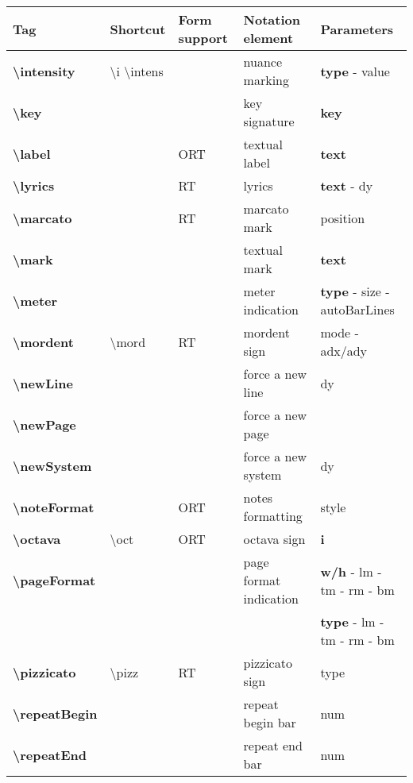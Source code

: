 \documentclass[a4paper, landscape, 10pt]{article}
\begin{document}
\begin{tabularx}{\linewidth}{p{3cm}p{4.5cm}p{3cm}p{5.5cm}l}
    \hline
    \textbf{Tag}&\textbf{Shortcut}&\textbf{Form support}&\textbf{Notation element}&\textbf{Parameters}\\
    \hline
    \textbf{\textbackslash{}intensity}&\textbackslash{}i \textbackslash{}intens&&nuance marking&\textbf{type} - value\\
    \hline
    \textbf{\textbackslash{}key}&&&key signature&\textbf{key}\\
    \hline
    \textbf{\textbackslash{}label}&&ORT&textual label&\textbf{text}\\
    \hline
    \textbf{\textbackslash{}lyrics}&&RT&lyrics&\textbf{text} - dy\\
    \hline
    \textbf{\textbackslash{}marcato}&&RT&marcato mark&position\\
    \hline
    \textbf{\textbackslash{}mark}&&&textual mark&\textbf{text}\\
    \hline
    \textbf{\textbackslash{}meter}&&&meter indication&\textbf{type} - size - autoBarLines\\
    \hline
    \textbf{\textbackslash{}mordent}&\textbackslash{}mord&RT&mordent sign&mode - adx/ady\\
    \hline
    \textbf{\textbackslash{}newLine}&&&force a new line&dy\\ %
    \hline
    \textbf{\textbackslash{}newPage}&&&force a new page&\\
    \hline
    \textbf{\textbackslash{}newSystem}&&&force a new system&dy\\ %
    \hline
    \textbf{\textbackslash{}noteFormat}&&ORT&notes formatting&style\\
    \hline
    \textbf{\textbackslash{}octava}&\textbackslash{}oct&ORT&octava sign&\textbf{i}\\ %
    \hline
    \textbf{\textbackslash{}pageFormat}&&&page format indication&\textbf{w/h} - lm - tm - rm - bm\\
    &&&&\textbf{type} - lm - tm - rm - bm\\
    \hline
    \textbf{\textbackslash{}pizzicato}&\textbackslash{}pizz&RT&pizzicato sign&type\\
    \hline
    \textbf{\textbackslash{}repeatBegin}&&&repeat begin bar&num\\
    \hline
    \textbf{\textbackslash{}repeatEnd}&&&repeat end bar&num\\

\end{tabularx}
\end{document}
